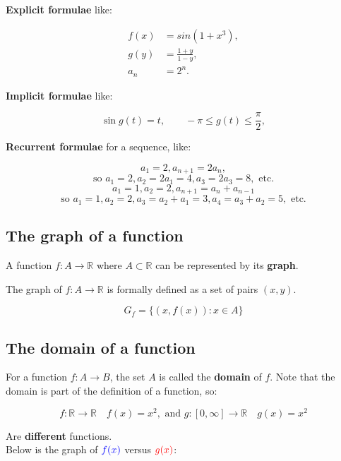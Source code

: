 \documentclass[11pt]{article}
\begin{document}
\textbf{Explicit formulae} like:

\begin{align*}
f(x) &= sin(1+x^3), \\
g(y) &= \frac{1+y}{1-y}, \\
a_n &= 2^n.
\end{align*}

\textbf{Implicit formulae} like:

\[\sin g(t) = t, \qquad -\pi \le g(t) \le \frac{\pi}{2},\]

\textbf{Recurrent formulae} for a sequence, like:

\[a_1 = 2, a_{n+1} = 2a_n,\]
\[\text{so } a_1 = 2, a_2 = 2a_1 = 4, a_3 = 2a_3 = 8, \text{ etc.}\]
\[a_1 = 1, a_2 = 2, a_{n+1} = a_n + a_{n-1}\]
\[\text{so } a_1 = 1, a_2 = 2, a_3 = a_2 + a_1 = 3, a_4 = a_3 + a_2 = 5, \text{ etc.}\]


\subsection{The graph of a function}
\label{sec:orgc4a412a}
A function \(f : A \rightarrow \mathbb{R}\) where \(A \subset \mathbb{R}\) can be represented by its \textbf{graph}.

The graph of \(f : A \rightarrow \mathbb{R}\) is formally defined as a set of pairs \((x, y)\).

\[G_f = \{(x, f(x)) : x \in A\}\]

\newpage

\subsection{The domain of a function}
\label{sec:org4764504}
For a function \(f : A \rightarrow B\), the set \(A\) is called the \textbf{domain} of \(f\). Note that the domain is part of the definition of a function, so:

\[f : \mathbb{R} \rightarrow \mathbb{R} \quad f(x) = x^2, \text{ and } g:[0, \infty] \rightarrow \mathbb{R} \quad g(x) = x^2\]

Are \textbf{different} functions.
\\[0pt]

Below is the graph of \(\color{blue} f(x)\) versus \(\color{red} g(x)\):
\\[0pt]

\begin{center}
\[\]

\end{center}
\end{document}

